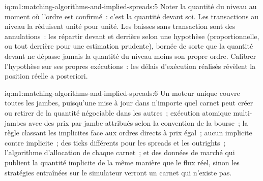 \begin{solution}{iq:m1:matching-algorithms-and-implied-spreads:5}
Noter la quantité du niveau au moment où l'ordre est confirmé~: c'est la
quantité devant soi. Les transactions au niveau la réduisent unité pour unité. Les baisses sans
transaction sont des annulations~: les répartir devant et derrière selon une hypothèse
(proportionnelle, ou tout derrière pour une estimation prudente), bornée de sorte que
la quantité devant ne dépasse jamais la quantité du niveau moins son propre ordre.
Calibrer l'hypothèse sur ses propres exécutions~: les délais d'exécution réalisés
révèlent la position réelle a posteriori.
\end{solution}

\begin{solution}{iq:m1:matching-algorithms-and-implied-spreads:6}
Un moteur unique couvre toutes les jambes, puisqu'une mise à jour dans n'importe quel carnet peut créer ou
retirer de la quantité négociable dans les autres~; exécution atomique multi-jambes avec des prix
par jambe attribués selon la convention de la bourse~; la règle classant les implicites
face aux ordres directs à prix égal~; aucun implicite contre implicite~; des ticks différents
pour les spreads et les outrights~; l'algorithme d'allocation de chaque carnet~; et
des données de marché qui publient la quantité implicite de la même manière que le flux réel,
sinon les stratégies entraînées sur le simulateur verront un carnet qui
n'existe pas.
\end{solution}
